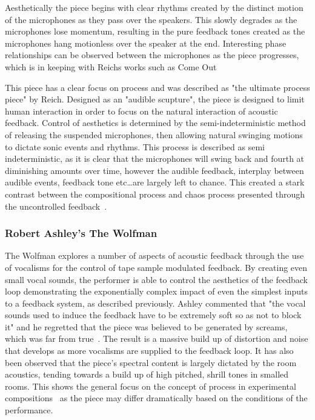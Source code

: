 \documentclass[titlepage]{scrartcl}
\begin{document}
    Aesthetically the piece begins with clear rhythms created by the distinct
    motion of the microphones as they pass over the speakers. This slowly
    degrades as the microphones lose momentum, resulting in the pure feedback
    tones created as the microphones hang motionless over the speaker at the
    end. Interesting phase relationships can be observed between the
    microphones as the piece progresses, which is in keeping with Reichs works
    such as Come Out~\citeyearpar{reich1966comeout}

    This piece has a clear focus on process and was described as "the ultimate
    process piece" by Reich.  Designed as an "audible scupture", the piece is
    designed to limit human interaction in order to focus on the natural
    interaction of acoustic feedback. Control of aesthetics is determined by
    the semi-indeterministic method of releasing the suspended microphones,
    then allowing natural swinging motions to dictate sonic events and rhythms.
    This process is described as semi indeterministic, as it is clear that the
    microphones will swing back and fourth at diminishing amounts over time,
    however the audible feedback, interplay between audible events, feedback
    tone etc\ldots are largely left to chance. This created a stark contrast
    between the compositional process and chaos process presented through the
    uncontrolled feedback~\parencite[p.186]{holmes2012eaem}.
    
    
    \subsubsection{Robert Ashley's The Wolfman~\citeyearpar{ashley2003w}}\label{wolfman} 
    
    The Wolfman explores a number of aspects of acoustic feedback through the
    use of vocalisms for the control of tape sample modulated feedback. By
    creating even small vocal sounds, the performer is able to control the
    aesthetics of the feedback loop demonstrating the exponentially complex
    impact of even the simplest inputs to a feedback system, as described
    previously. Ashley commented that "the vocal sounds used to induce the
    feedback have to be extremely soft so as not to block it" and he regretted
    that the piece was believed to be generated by screams, which was far from
    true~\parencite[p.37]{gann2012ra}. The result is a massive build up of
    distortion and noise that develops as more vocalisms are supplied to the
    feedback loop. It has also been observed that the piece's spectral content
    is largely dictated by the room acoustics, tending towards a build up of
    high pitched, shrill tones in smalled rooms. This shows the general focus
    on the concept of process in experimental
    compositions~\parencite[p.18]{cage2011silence} as the piece may differ
    dramatically based on the conditions of the performance.
\end{document}
